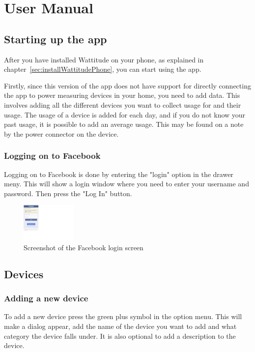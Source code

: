 \chapter{User Manual}

\section{Starting up the app}
After you have installed Wattitude on your phone, as explained in chapter~\ref{sec:installWattitudePhone}, you can start using the app. 

Firstly, since this version of the app does not have support for directly connecting the app to power measuring devices in your home, you need to add data. This involves adding all the different devices you want to collect usage for and their usage. The usage of a device is added for each day, and if you do not know your past usage, it is possible to add an average usage. This may be found on a note by the power connector on the device.

\subsection{Logging on to Facebook}
Logging on to Facebook is done by entering the "login" option in the drawer meny. This will show a login window where you need to enter your username and password. Then press the "Log In" button. 

\begin{figure}[H]
\centering
\includegraphics[width=0.24\textwidth, clip, trim=0cm 5.5cm 20.5cm 0cm]{appendix/usermanual/fig/Facebooklogin.png}
\caption{Screenshot of the Facebook login screen}
\end{figure}


\label{sec:devices}
\section{Devices}
\subsection{Adding a new device}
To add a new device press the green plus symbol in the option menu. This will make a dialog appear, add the name of the device you want to add and what category the device falls under. It is also optional to add a description to the device.

